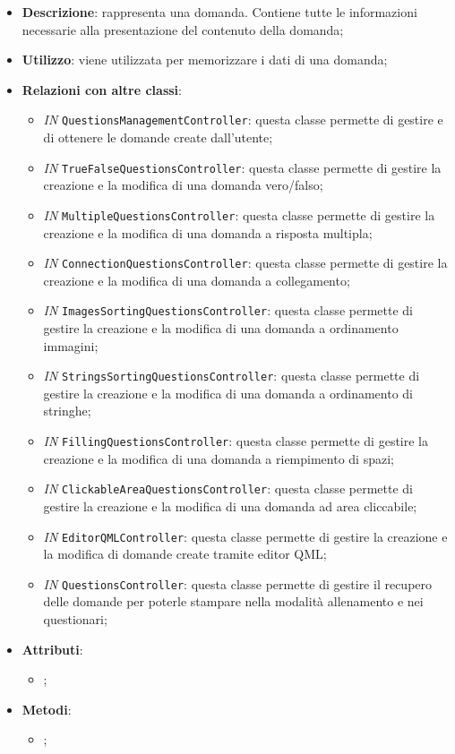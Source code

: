		\begin{itemize}
			\item \textbf{Descrizione}: rappresenta una domanda. Contiene tutte le informazioni necessarie alla
			presentazione del contenuto della domanda;
			\item \textbf{Utilizzo}: viene utilizzata per memorizzare i dati di una domanda;
			\item \textbf{Relazioni con altre classi}: 
			\begin{itemize}
				\item \textit{IN} \texttt{QuestionsManagementController}: questa classe permette di gestire e di ottenere le domande create dall'utente;
				\item \textit{IN} \texttt{TrueFalseQuestionsController}: questa classe permette di gestire la creazione e la modifica di una domanda vero/falso;
				\item \textit{IN} \texttt{MultipleQuestionsController}: questa classe permette di gestire la creazione e la modifica di una domanda a risposta multipla; 
				\item \textit{IN} \texttt{ConnectionQuestionsController}: questa classe permette di gestire la creazione e la modifica di una domanda a collegamento;
				\item \textit{IN} \texttt{ImagesSortingQuestionsController}: questa classe permette di gestire la creazione e la modifica di una domanda a ordinamento immagini;
				\item \textit{IN} \texttt{StringsSortingQuestionsController}: questa classe permette di gestire la creazione e la modifica di una domanda a ordinamento di stringhe;
				\item \textit{IN} \texttt{FillingQuestionsController}: questa classe permette di gestire la creazione e la modifica di una domanda a riempimento di spazi; 
				\item \textit{IN} \texttt{ClickableAreaQuestionsController}: questa classe permette di gestire la creazione e la modifica di una domanda ad area cliccabile;
				\item \textit{IN} \texttt{EditorQMLController}: questa classe permette di gestire la creazione e la modifica di domande create tramite editor QML;
				\item \textit{IN} \texttt{QuestionsController}: questa classe permette di gestire il recupero delle domande per poterle stampare nella modalità allenamento e nei questionari;
			\end{itemize}
			\item \textbf{Attributi}: 
			\begin{itemize}
				\item ;
			\end{itemize}
			\item \textbf{Metodi}: 
			\begin{itemize}
				\item ;
			\end{itemize}
		\end{itemize}
		
